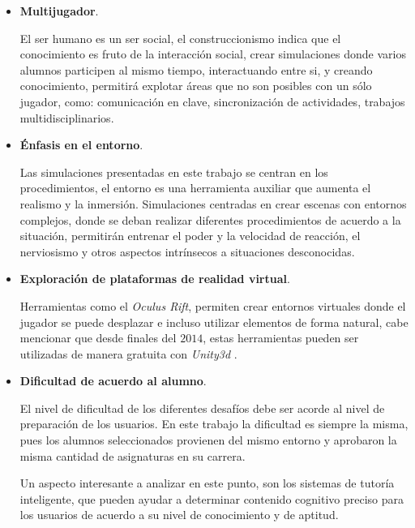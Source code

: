 \begin{itemize}
\item \textbf{Multijugador}.

El ser humano es un ser social, el construccionismo indica que el conocimiento
es fruto de la interacción social, crear simulaciones donde varios alumnos
participen al mismo tiempo, interactuando entre si, y creando conocimiento,
permitirá explotar áreas que no son posibles con un sólo jugador, como:
comunicación en clave, sincronización de actividades, trabajos
multidisciplinarios.

\item \textbf{Énfasis en el entorno}.

Las simulaciones presentadas en este trabajo se centran en los procedimientos,
el entorno es una herramienta auxiliar que aumenta el realismo y la inmersión.
Simulaciones centradas en crear escenas con entornos complejos, donde se deban
realizar diferentes procedimientos de acuerdo a la situación, permitirán
entrenar el poder y la velocidad de reacción, el nerviosismo y otros aspectos
intrínsecos a situaciones desconocidas. 


\item \textbf{Exploración de plataformas de realidad virtual}.

Herramientas como el \emph{Oculus Rift}, permiten crear entornos virtuales donde
el jugador se puede desplazar e incluso utilizar elementos de forma
natural\cite{makerbot}, cabe mencionar que desde finales del $2014$, estas
herramientas pueden ser utilizadas de manera gratuita con \emph{Unity3d}
\cite{unity:vr}.


\item \textbf{Dificultad de acuerdo al alumno}.

El nivel de dificultad de los diferentes desafíos debe ser acorde al nivel de
preparación de los usuarios. En este trabajo la dificultad es siempre la misma,
pues los alumnos seleccionados provienen del mismo entorno y aprobaron la misma
cantidad de asignaturas en su carrera.

Un aspecto interesante a analizar en este punto, son los sistemas de tutoría
inteligente, que pueden ayudar a determinar contenido cognitivo preciso para los
usuarios de acuerdo a su nivel de conocimiento y de aptitud.


\end{itemize}
